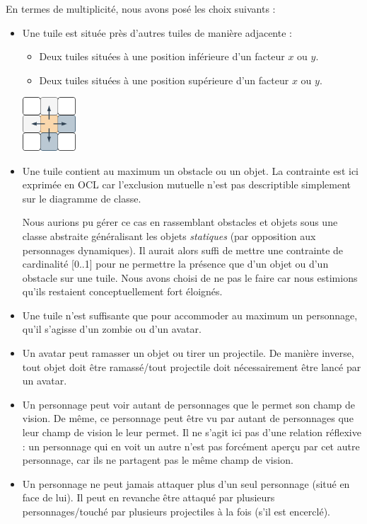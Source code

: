 \documentclass[oneside,a4paper]{book}
\begin{document}
En termes de multiplicité, nous avons posé les choix suivants :
\begin{itemize}
    \item Une tuile est située près d'autres tuiles de manière adjacente : 
        \begin{itemize}
            \item Deux tuiles situées à une position inférieure d'un facteur $x$ ou $y$.
            \item Deux tuiles situées à une position supérieure d'un facteur $x$ ou $y$.
        \end{itemize}
        \begin{center}
            \includegraphics[height=2cm,keepaspectratio]{Images/Tile.png}    
        \end{center}
    \item Une tuile contient au maximum un obstacle ou un objet. La contrainte est ici exprimée en OCL car l'exclusion mutuelle n'est pas descriptible simplement sur le diagramme de classe.
    \begin{tcolorbox}
        Nous aurions pu gérer ce cas en rassemblant obstacles et objets sous une classe abstraite généralisant les objets \textit{statiques} (par opposition aux personnages dynamiques). Il aurait alors suffi de mettre une contrainte de cardinalité [0..1] pour ne permettre la présence que d'un objet ou d'un obstacle sur une tuile. Nous avons choisi de ne pas le faire car nous estimions qu'ils restaient conceptuellement fort éloignés.
    \end{tcolorbox}
    \item Une tuile n'est suffisante que pour accommoder au maximum un personnage, qu'il s'agisse d'un zombie ou d'un avatar.
    \item Un avatar peut ramasser un objet ou tirer un projectile. De manière inverse, tout objet doit être ramassé/tout projectile doit nécessairement être lancé par un avatar.
    \item Un personnage peut voir autant de personnages que le permet son champ de vision. De même, ce personnage peut être vu par autant de personnages que leur champ de vision le leur permet. Il ne s'agit ici pas d'une relation réflexive : un personnage qui en voit un autre n'est pas forcément aperçu par cet autre personnage, car ils ne partagent pas le même champ de vision.
    \item Un personnage ne peut jamais attaquer plus d'un seul personnage (situé en face de lui). Il peut en revanche être attaqué par plusieurs personnages/touché par plusieurs projectiles à la fois (s'il est encerclé).
\end{itemize}
\end{document}
